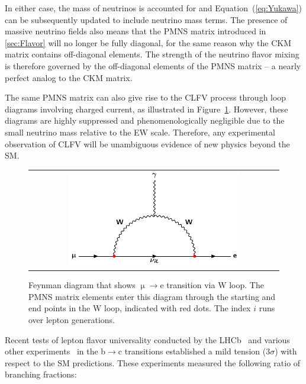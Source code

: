 In either case, the mass of neutrinos is accounted for and Equation~(\ref{eq:Yukawa}) can be subsequently updated to include neutrino mass terms. The presence of massive neutrino fields also means that the \ac{PMNS} matrix introduced in \autoref{sec:Flavor} will no longer be fully diagonal, for the same reason why the \ac{CKM} matrix contains off-diagonal elements. The strength of the neutrino flavor mixing is therefore governed by the off-diagonal elements of the \ac{PMNS} matrix -- a nearly perfect analog to the \ac{CKM} matrix. 

The same \ac{PMNS} matrix can also give rise to the \ac{CLFV} process through loop diagrams involving charged current, as illustrated in Figure~\ref{fig:mutoe}. However, these diagrams are highly suppressed and phenomenologically negligible due to the small neutrino mass relative to the \ac{EW} scale. Therefore, any experimental observation of \ac{CLFV} will be unambiguous evidence of new physics beyond the \ac{SM}.

\begin{figure}[tbh!]
 \begin{center}
 \begin{tabular}{c}
 \includegraphics[width=0.7\textwidth]{figures/Part1/BSM/mutoe}
 \end{tabular}
 \caption{Feynman diagram that shows $\upmu\rightarrow$e transition via W loop. The \ac{PMNS} matrix elements enter this diagram through the starting and end points in the W loop, indicated with red dots. The index $i$ runs over lepton generations.}
 \label{fig:mutoe}
 \end{center}
\end{figure}

Recent tests of lepton flavor universality conducted by the \ac{LHCb}~\cite{LHCb:2023zxo} and various other experiments~\cite{HFLAV} in the b$\rightarrow$c transitions established a mild tension (3$\sigma$) with respect to the \ac{SM} predictions. These experiments measured the following ratio of branching fractions:

